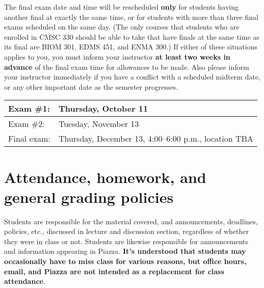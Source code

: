 \documentclass[10pt]{article}
\begin{document}
    The final exam date and time will be rescheduled \textbf{only} for
  students having another final at exactly the same time, or for students
  with more than three final exams scheduled on the same day.  (The only
  courses that students who are enrolled in CMSC 330 should be able to take
  that have finals at the same time as its final are BIOM 301, EDMS 451, and
  ENMA 300.)  If either of these situations applies to you, you must inform
  your instructor \textbf{at least two weeks in advance} of the final exam
  time for allowances to be made.  Also please inform your instructor
  immediately if you have a conflict with a scheduled midterm date, or any
  other important date as the semester progresses.

    \vspace{-1.5mm}

    \begin{center}

      \renewcommand{\arraystretch}{1.15}

      \begin{tabular}[t]{|l|l|}

        \hline

        Exam \#1:
          & Thursday, October 11
          \\ \hline

        Exam \#2:
          & Tuesday, November 13
          \\ \hline

        Final exam:
          & Thursday, December 13, 4:00--6:00 p.m., location TBA
          \\ \hline

      \end{tabular}

    \end{center}

    \vspace{-2mm}

  \section{Attendance, homework, and general grading policies}

    Students are responsible for the material covered, and announcements,
  deadlines, policies, etc., discussed in lecture and discussion section,
  regardless of whether they were in class or not.  Students are likewise
  responsible for announcements and information appearing in Piazza.
  \textbf{It's understood that students may occasionally have to miss class
  for various reasons, but office hours, email, and Piazza are not
  intended as a replacement for class attendance}.
\end{document}
